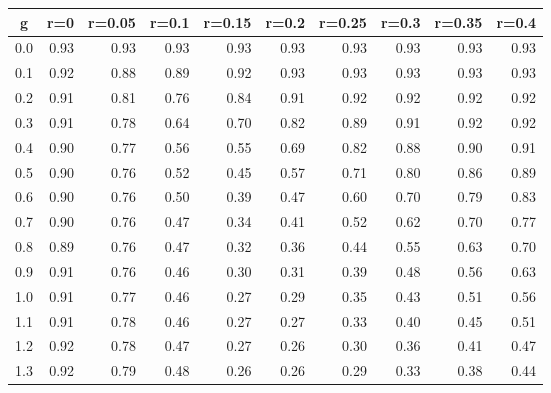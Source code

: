 %
\begin{table}[!tbp]
 \begin{center}
 \begin{tabular}{rrrrrrrrrr}\hline\hline
\multicolumn{1}{c}{g}&\multicolumn{1}{c}{r=0}&\multicolumn{1}{c}{r=0.05}&\multicolumn{1}{c}{r=0.1}&\multicolumn{1}{c}{r=0.15}&\multicolumn{1}{c}{r=0.2}&\multicolumn{1}{c}{r=0.25}&\multicolumn{1}{c}{r=0.3}&\multicolumn{1}{c}{r=0.35}&\multicolumn{1}{c}{r=0.4}\tabularnewline
\hline
0.0&0.93&0.93&0.93&0.93&0.93&0.93&0.93&0.93&0.93\tabularnewline
0.1&0.92&0.88&0.89&0.92&0.93&0.93&0.93&0.93&0.93\tabularnewline
0.2&0.91&0.81&0.76&0.84&0.91&0.92&0.92&0.92&0.92\tabularnewline
0.3&0.91&0.78&0.64&0.70&0.82&0.89&0.91&0.92&0.92\tabularnewline
0.4&0.90&0.77&0.56&0.55&0.69&0.82&0.88&0.90&0.91\tabularnewline
0.5&0.90&0.76&0.52&0.45&0.57&0.71&0.80&0.86&0.89\tabularnewline
0.6&0.90&0.76&0.50&0.39&0.47&0.60&0.70&0.79&0.83\tabularnewline
0.7&0.90&0.76&0.47&0.34&0.41&0.52&0.62&0.70&0.77\tabularnewline
0.8&0.89&0.76&0.47&0.32&0.36&0.44&0.55&0.63&0.70\tabularnewline
0.9&0.91&0.76&0.46&0.30&0.31&0.39&0.48&0.56&0.63\tabularnewline
1.0&0.91&0.77&0.46&0.27&0.29&0.35&0.43&0.51&0.56\tabularnewline
1.1&0.91&0.78&0.46&0.27&0.27&0.33&0.40&0.45&0.51\tabularnewline
1.2&0.92&0.78&0.47&0.27&0.26&0.30&0.36&0.41&0.47\tabularnewline
1.3&0.92&0.79&0.48&0.26&0.26&0.29&0.33&0.38&0.44\tabularnewline
\hline
\end{tabular}

\end{center}

\end{table}

